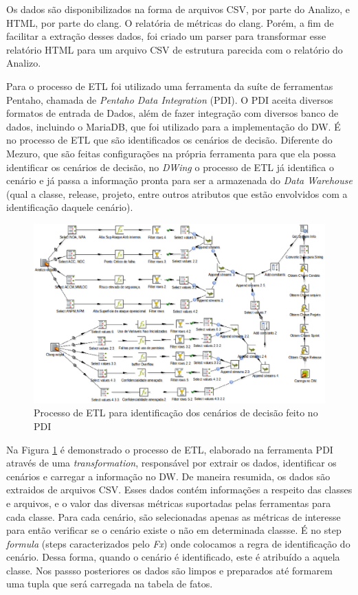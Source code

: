 %
Os dados são disponibilizados na forma de arquivos CSV, por parte do Analizo, e HTML, por parte do clang. O relatória de métricas do clang. Porém, a fim de facilitar a extração desses dados, foi criado um parser para transformar esse relatório HTML para um arquivo CSV de estrutura parecida com o relatório do Analizo.


Para o processo de ETL foi utilizado uma ferramenta da suíte de ferramentas Pentaho, chamada de \emph{Pentaho Data Integration} (PDI). O PDI aceita diversos formatos de entrada de Dados, além de fazer integração com diversos banco de dados, incluindo o MariaDB, que foi utilizado para a implementação do DW. É no processo de ETL que são identificados os cenários de decisão. Diferente do Mezuro, que são feitas configurações na própria ferramenta para que ela possa identificar os cenários de decisão, no \emph{DWing} o processo de ETL já identifica o cenário e já passa a informação pronta para ser a armazenada do \emph{Data Warehouse} (qual a classe, release, projeto, entre outros atributos que estão envolvidos com a identificação daquele cenário).


\begin{figure}[H]
 	\centering
 		\includegraphics[scale=0.5]{figuras/dw-etlpdi}
 		\caption{Processo de ETL para identificação dos cenários de decisão feito no PDI}
 		\label{dw-etl-pdi}
 \end{figure}

Na Figura \ref{dw-etl-pdi} é demonstrado o processo de ETL, elaborado na ferramenta PDI através de uma \emph{transformation}, responsável por extrair os dados, identificar os cenários e carregar a informação no DW. De maneira resumida, os dados são extraidos de arquivos CSV. Esses dados contém informações a respeito das classes e arquivos, e o valor das diversas métricas suportadas pelas ferramentas para cada classe. Para cada cenário, são selecionadas apenas as métricas de interesse para então verificar se o cenário existe o não em determinada classse. É no step \emph{formula} (steps caracterizados pelo \emph{Fx}) onde colocamos a regra de identificação do cenário. Dessa forma, quando o cenário é identificado, este é atribuído a aquela classe. Nos passso posteriores os dados são limpos e preparados até formarem uma tupla que será carregada na tabela de fatos. %


